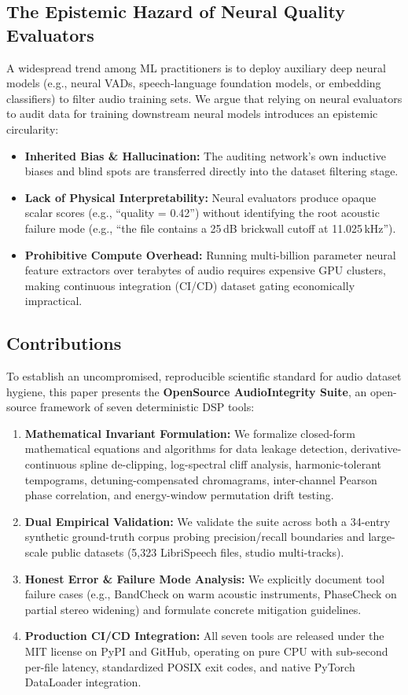 \documentclass[10pt,journal,compsoc]{IEEEtran}
\begin{document}
\subsection{The Epistemic Hazard of Neural Quality Evaluators}
A widespread trend among ML practitioners is to deploy auxiliary deep neural models (e.g., neural VADs, speech-language foundation models, or embedding classifiers) to filter audio training sets. We argue that relying on neural evaluators to audit data for training downstream neural models introduces an epistemic circularity:
\begin{itemize}
    \item \textbf{Inherited Bias \& Hallucination:} The auditing network's own inductive biases and blind spots are transferred directly into the dataset filtering stage.
    \item \textbf{Lack of Physical Interpretability:} Neural evaluators produce opaque scalar scores (e.g., ``quality = 0.42'') without identifying the root acoustic failure mode (e.g., ``the file contains a 25\,dB brickwall cutoff at 11.025\,kHz'').
    \item \textbf{Prohibitive Compute Overhead:} Running multi-billion parameter neural feature extractors over terabytes of audio requires expensive GPU clusters, making continuous integration (CI/CD) dataset gating economically impractical.
\end{itemize}

\subsection{Contributions}
To establish an uncompromised, reproducible scientific standard for audio dataset hygiene, this paper presents the \textbf{OpenSource AudioIntegrity Suite}, an open-source framework of seven deterministic DSP tools:
\begin{enumerate}
    \item \textbf{Mathematical Invariant Formulation:} We formalize closed-form mathematical equations and algorithms for data leakage detection, derivative-continuous spline de-clipping, log-spectral cliff analysis, harmonic-tolerant tempograms, detuning-compensated chromagrams, inter-channel Pearson phase correlation, and energy-window permutation drift testing.
    \item \textbf{Dual Empirical Validation:} We validate the suite across both a 34-entry synthetic ground-truth corpus probing precision/recall boundaries and large-scale public datasets (5,323 LibriSpeech files, studio multi-tracks).
    \item \textbf{Honest Error & Failure Mode Analysis:} We explicitly document tool failure cases (e.g., BandCheck on warm acoustic instruments, PhaseCheck on partial stereo widening) and formulate concrete mitigation guidelines.
    \item \textbf{Production CI/CD Integration:} All seven tools are released under the MIT license on PyPI and GitHub, operating on pure CPU with sub-second per-file latency, standardized POSIX exit codes, and native PyTorch DataLoader integration.
\end{enumerate}
\end{document}
